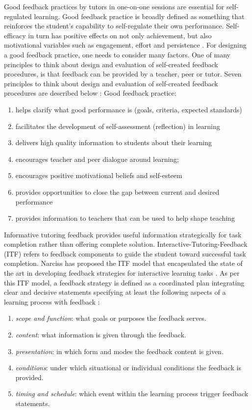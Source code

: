 Good feedback practices by tutors in one-on-one sessions are essential for self-regulated learning. Good feedback practice is broadly defined as something that reinforces the student's capability to self-regulate their own performance. Self-efficacy in turn has positive effects on not only achievement, but also motivational variables such as engagement, effort and persistence \parencite{narciss2004impact}. For designing a good feedback practice, one needs to consider many factors. One of many principles to think about design and evaluation of self-created feedback procedures, is that feedback can be provided by a teacher, peer or tutor. Seven principles to think about design and evaluation of self-created feedback procedures are described below \parencite{nicol2006formative}: 
Good feedback practice: 
\begin{enumerate}
    \item helps clarify what good performance is (goals, criteria, expected standards)
    \item facilitates the development of self-assessment (reflection) in learning
    \item delivers high quality information to students about their learning
    \item encourages teacher and peer dialogue around learning;
    \item  encourages positive motivational beliefs and self-esteem
    \item provides opportunities to close the gap between current and desired performance
    \item  provides information to teachers that can be used to help shape teaching
\end{enumerate}
Informative tutoring feedback provides useful information strategically for task completion rather than offering complete solution. Interactive-Tutoring-Feedback (ITF) refers to feedback components to guide the student toward successful task completion. Narciss has proposed the ITF model that encapsulated the state of the art in developing feedback strategies for interactive learning tasks \parencite{narciss2005informatives} \parencite{narciss2008feedback} \parencite{narciss2013designing}. As per this ITF model, a feedback strategy is defined as a coordinated plan integrating clear and decisive statements specifying at least the following aspects of a learning process with feedback \parencite{narciss2012feedback}:
\begin{enumerate}
    \item \textit{scope and function}: what goals or purposes the feedback serves.
    \item \textit{content}: what information is given through the feedback.
    \item \textit{presentation}: in which form and modes the feedback content is given.
    \item \textit{conditions}: under which situational or individual conditions the feedback is provided.
    \item \textit{timing and schedule}: which event within the learning process trigger feedback statements. 
\end{enumerate}
